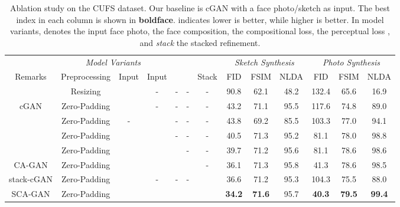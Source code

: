 \documentclass[journal]{IEEEtran}
\begin{document}
\begin{table*}
\centering
\caption{Ablation study on the CUFS dataset. Our baseline is cGAN with a face photo/sketch as input. The best index in each column is shown in \textbf{boldface}.  indicates lower is better, while  higher is better. In model variants,  denotes the input face photo,  the face composition,   the compositional loss,  the perceptual loss , and \textit{stack} the stacked refinement.}
\footnotesize
\label{tab:ablation}
\begin{tabular}{c|cccccc|ccc|ccc}
\toprule
\multicolumn{7}{c|}{\textit{Model Variants}}					&	\multicolumn{3}{c|}{\textit{Sketch Synthesis}}					&	\multicolumn{3}{c}{\textit{Photo Synthesis}}					\\	
Remarks	& Preprocessing	&	Input 	&	Input 	&		&		&	Stack	&	FID	&	FSIM	&	NLDA	&	FID	&	FSIM	&	NLDA	\\	
\midrule
& Resizing &		&	-	&	-	&	-	&	-	&	90.8 	&	62.1	&	48.2 	&	132.4 	&	65.6	&	16.9 	\\
cGAN	& Zero-Padding &		&	-	&	-	&	-	&	-	&	43.2	&	71.1	&	95.5	&	117.6	&	74.8	&	89.0	\\	
	& Zero-Padding &	-	&		&	-	&	-	&	-	&	43.8	&	69.2	&	85.5	&	103.3	&	77.0	&	94.1	\\	& Zero-Padding &		&		&	-	&	-	&	-	&	40.5	&	71.3	&	95.2	&	81.1	&	78.0	&	98.8	\\	
& Zero-Padding &		&		&		&	-	&	-	&	39.7	&	71.2	&	95.6	&	81.1	&	78.6	&	98.6	\\	
CA-GAN	& Zero-Padding &		&		&		&		&	-	&	36.1 
&	71.3 &	95.8 &	41.3	&	78.6	&	98.5 	\\	

\midrule
stack-cGAN	& Zero-Padding &		&	-	&	-	&	-	&		&	36.6	&	71.2	&	95.3	&	104.3	&	75.5	&	88.0	\\	SCA-GAN	& Zero-Padding &		&		&		&		&		&	\textbf{34.2}	&	\textbf{71.6}	&	95.7	&	\textbf{40.3} & \textbf{79.5}	&	\textbf{99.4} 	\\	
\bottomrule	
\end{tabular}
\vspace{-0.2cm}
\end{table*}
\end{document}
